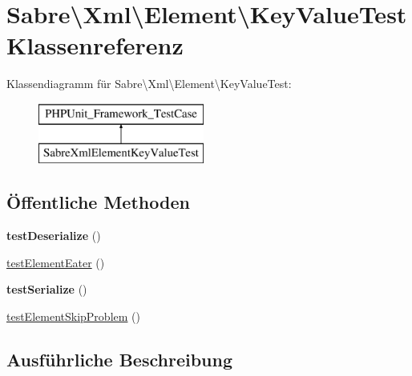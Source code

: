 \hypertarget{class_sabre_1_1_xml_1_1_element_1_1_key_value_test}{}\section{Sabre\textbackslash{}Xml\textbackslash{}Element\textbackslash{}Key\+Value\+Test Klassenreferenz}
\label{class_sabre_1_1_xml_1_1_element_1_1_key_value_test}
Klassendiagramm für Sabre\textbackslash{}Xml\textbackslash{}Element\textbackslash{}Key\+Value\+Test\+:\begin{figure}[H]
\begin{center}
\leavevmode
\includegraphics[height=2.000000cm]{class_sabre_1_1_xml_1_1_element_1_1_key_value_test}
\end{center}
\end{figure}
\subsection*{Öffentliche Methoden}
\begin{DoxyCompactItemize}
\item 
\mbox{\label{class_sabre_1_1_xml_1_1_element_1_1_key_value_test_aea1ed6cbec66f9b56d829654ef17d7ac}} 
{\bfseries test\+Deserialize} ()
\item 
\mbox{\hyperlink{class_sabre_1_1_xml_1_1_element_1_1_key_value_test_a54ac347f5901ec219b7b5c426f742643}{test\+Element\+Eater}} ()
\item 
\mbox{\label{class_sabre_1_1_xml_1_1_element_1_1_key_value_test_a1c0b52b9e4e7e1c5804b28ec06a83283}} 
{\bfseries test\+Serialize} ()
\item 
\mbox{\hyperlink{class_sabre_1_1_xml_1_1_element_1_1_key_value_test_a69173ced7292c40364f3ec9a3374b86c}{test\+Element\+Skip\+Problem}} ()
\end{DoxyCompactItemize}


\subsection{Ausführliche Beschreibung}


